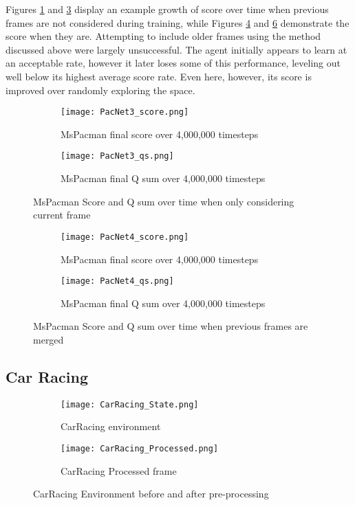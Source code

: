 \documentclass{article}
\begin{document}
Figures \ref{fig:mspacman_score} and \ref{fig:mspacman_qs} display an example growth of score over time when previous frames are not considered during training, while Figures \ref{fig:mspacman_history_score} and \ref{fig:mspacman_history_qs} demonstrate the score when they are. Attempting to include older frames using the method discussed above were largely unsuccessful. The agent initially appears to learn at an acceptable rate, however it later loses some of this performance, leveling out well below its highest average score rate. Even here, however, its score is improved over randomly exploring the space.

\begin{figure}[h]
\centering
\begin{subfigure}{.6\textwidth}
  \centering
  \texttt{[image: PacNet3\_score.png]}
  \caption{\label{fig:mspacman_score}MsPacman final score over 4,000,000 timesteps}
\end{subfigure}%
\begin{subfigure}{.6\textwidth}
  \centering
  \texttt{[image: PacNet3\_qs.png]}
  \caption{\label{fig:mspacman_qs}MsPacman final Q sum over 4,000,000 timesteps}
\end{subfigure}
\caption{MsPacman Score and Q sum over time when only considering current frame}
\end{figure}

\begin{figure}[h]
\centering
\begin{subfigure}{.6\textwidth}
  \centering
  \texttt{[image: PacNet4\_score.png]}
  \caption{\label{fig:mspacman_history_score}MsPacman final score over 4,000,000 timesteps}
\end{subfigure}%
\begin{subfigure}{.6\textwidth}
  \centering
  \texttt{[image: PacNet4\_qs.png]}
  \caption{\label{fig:mspacman_history_qs}MsPacman final Q sum over 4,000,000 timesteps}
\end{subfigure}
\caption{MsPacman Score and Q sum over time when previous frames are merged}
\end{figure}


\subsection{Car Racing}

\begin{figure}[h]
\centering
\begin{subfigure}{.6\textwidth}
  \centering
  \texttt{[image: CarRacing\_State.png]}
  \caption{\label{fig:carracing_raw}CarRacing environment}
\end{subfigure}%
\begin{subfigure}{.6\textwidth}
  \centering
  \texttt{[image: CarRacing\_Processed.png]}
  \caption{\label{fig:carracing_processed}CarRacing Processed frame}
\end{subfigure}
\caption{CarRacing Environment before and after pre-processing}
\end{figure}
\end{document}
